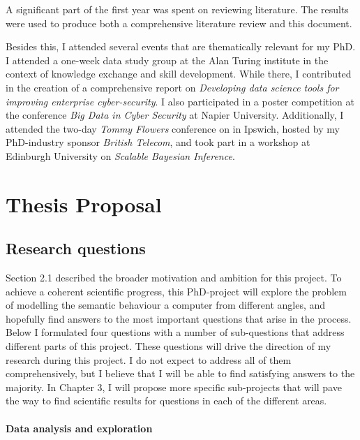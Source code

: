 \documentclass[a4paper,12pt,twoside]{report}
\begin{document}
A significant part of the first year was spent on reviewing literature. The results were used to produce both a comprehensive literature review and this document. 


Besides this, I attended several events that are thematically relevant for my PhD. I attended a one-week data study group at the Alan Turing institute in the context of knowledge exchange and skill development. While there, I contributed in the creation of a comprehensive report on \textit{Developing data science tools for improving enterprise cyber-security}. I also participated in a poster competition at the conference \textit{Big Data in Cyber Security} at Napier University. Additionally, I attended the two-day \textit{Tommy Flowers} conference on  in Ipswich, hosted by my PhD-industry sponsor \textit{British Telecom}, and took part in a workshop at Edinburgh University on \textit{Scalable Bayesian Inference}.







\chapter{Thesis Proposal}\label{Obj}


\section{Research questions}\label{RQ}

Section 2.1 described the broader motivation and ambition for this project. To achieve a coherent scientific progress, this PhD-project will explore the problem of modelling the semantic behaviour a computer from different angles, and hopefully find answers to the most important questions that arise in the process. Below I formulated four questions with a number of sub-questions that address different parts of this project. These questions will drive the direction of my research during this project. I do not expect to address all of them comprehensively, but I believe that I will be able to find satisfying answers to the majority. In Chapter 3, I will propose more specific sub-projects that will pave the way to find scientific results for questions in each of the different areas.


\subsubsection{Data analysis and exploration}
\end{document}
